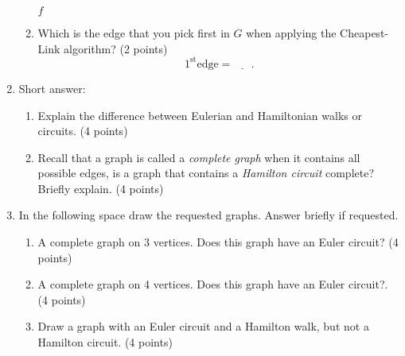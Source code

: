 \documentclass[12pt]{exam}
\begin{document}
\begin{enumerate}
\begin{enumerate}
\begin{checkboxes}
    \choice $f$
\end{checkboxes}
\vfill
\item \label{lastQnSec2} Which is the edge that you pick first in $G$ when applying the Cheapest-Link algorithm? (2 points)
$$1^{\text{st}}\text{edge}=\underline{\phantom{ans}}.$$
\vfill
\end{enumerate}
\newpage
\item Short answer:
\begin{enumerate}
    \item Explain the difference between Eulerian and Hamiltonian walks or circuits. (4 points)
    \vspace{3cm}
    \item Recall that a graph is called a \emph{complete graph} when it contains all possible edges, is a graph that contains a \emph{Hamilton circuit} complete? Briefly explain. (4 points)
    \vspace{3cm}
\end{enumerate}


\item In the following space draw the requested graphs. Answer briefly if requested.
\begin{enumerate}
    \item A complete graph on 3 vertices. Does this graph have an Euler circuit? (4 points)
    \vspace{3.5cm}
    \item A complete graph on 4 vertices. Does this graph have an Euler circuit?. (4 points)
    \vspace{3.5cm}
    \item Draw a graph with an Euler circuit and a Hamilton walk, but not a Hamilton circuit. (4 points)
    \vfill
\end{enumerate}


\end{enumerate}
\end{document}
